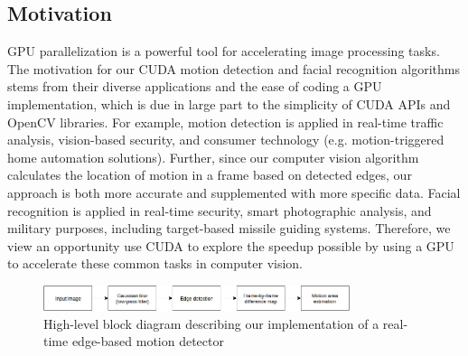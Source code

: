\documentclass[journal]{IEEEtran}
\begin{document}
\subsection{Motivation}
GPU parallelization is a powerful tool for accelerating image processing tasks. The motivation for our CUDA motion detection and facial recognition algorithms stems from their diverse applications and the ease of coding a GPU implementation, which is due in large part to the simplicity of CUDA APIs and OpenCV libraries. For example, motion detection is applied in real-time traffic analysis, vision-based security, and consumer technology (e.g. motion-triggered home automation solutions). Further, since our computer vision algorithm calculates the location of motion in a frame based on detected edges, our approach is both more accurate and supplemented with more specific data. Facial recognition is applied in real-time security, smart photographic analysis, and military purposes, including target-based missile guiding systems. Therefore, we view an opportunity use CUDA to explore the speedup possible by using a GPU to accelerate these common tasks in computer vision.

\begin{figure}
	\centering
	\includegraphics[width=0.8\textwidth]{high_level_block_diagram.png}
	\caption{High-level block diagram describing our implementation of a real-time edge-based motion detector}
	\label{motion-detection-block-diagram}
\end{figure}
\end{document}
